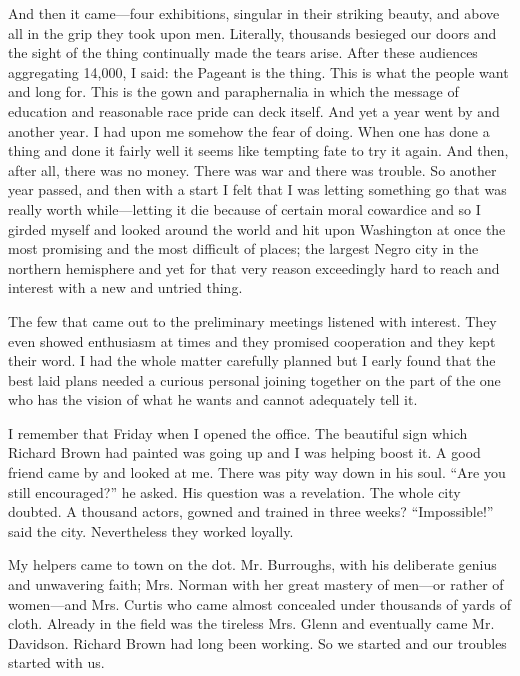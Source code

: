 \documentclass[letterpaper,10pt,english]{jupyterBook}
\begin{document}
\sphinxAtStartPar
And then it came—four exhibitions, singular in their striking beauty, and above all in the grip they took upon men. Literally, thousands besieged our doors and the sight of the thing continually made the tears arise. After these audiences aggregating 14,000, I said: the Pageant is the thing. This is what the people want and long for. This is the gown and paraphernalia in which the message of education and reasonable race pride can deck itself. And yet a year went by and another year. I had upon me somehow the fear of doing. When one has done a thing and done it fairly well it seems like tempting fate to try it again. And then, after all, there was no money. There was war and there was trouble. So another year passed, and then with a start I felt that I was letting something go that was really worth while—letting it die because of certain moral cowardice and so I girded myself and looked around the world and hit upon Washington at once the most promising and the most difficult of places; the largest Negro city in the northern hemisphere and yet for that very reason exceedingly hard to reach and interest with a new and untried thing.

\sphinxAtStartPar
The few that came out to the preliminary meetings listened with interest. They even showed enthusiasm at times and they promised cooperation and they kept their word. I had the whole matter carefully planned but I early found that the best laid plans needed a curious personal joining together on the part of the one who has the vision of what he wants and cannot adequately tell it.

\sphinxAtStartPar
I remember that Friday when I opened the office. The beautiful sign which Richard Brown had painted was going up and I was helping boost it. A good friend came by and looked at me. There was pity way down in his soul. “Are you still encouraged?” he asked. His question was a revelation. The whole city doubted. A thousand actors, gowned and trained in three weeks? “Impossible!” said the city. Nevertheless they worked loyally.

\sphinxAtStartPar
My helpers came to town on the dot. Mr. Burroughs, with his deliberate genius and unwavering faith; Mrs. Norman with her great mastery of men—or rather of women—and Mrs. Curtis who came almost concealed under thousands of yards of cloth. Already in the field was the tireless Mrs. Glenn and eventually came Mr. Davidson. Richard Brown had long been working. So we started and our troubles started with us.
\end{document}
